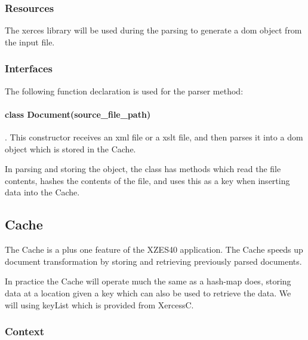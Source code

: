 \subsubsection{Resources}

The \gls{xerces} library will be used during the parsing to generate a \gls{dom} object from the input file.

\subsubsection{Interfaces}

The following function declaration is used for the parser method:

\paragraph{class Document(source\_file\_path)}. This constructor receives an \gls{xml} file or a \gls{xslt} file, and then parses it into a \gls{dom} object which is stored in the Cache.

In parsing and storing the object, the class has methods which read the file contents, hashes the contents of the file, and uses this as a key when inserting data into the Cache.

\subsection{Cache}
\label{cache}

The Cache is a plus one feature of the XZES40 application.
The Cache speeds up document transformation by storing and retrieving previously parsed documents.

In practice the Cache will operate much the same as a \gls{hash-map} does, storing data at a location given a key which can also be used to retrieve the data.
We will using keyList which is provided from XercessC.

\subsubsection{Context}


